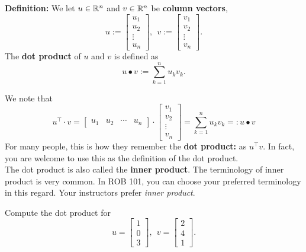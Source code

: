 \begin{tcolorbox}[title=\textbf{\Large Dot Product or Inner Product}]
\textbf{Definition:} We let $u\in \mathbb R^n$ and $v\in \mathbb R^n$ be \textbf{column vectors},
$$u := \begin{bmatrix} u_1 \\ u_2 \\ \vdots \\ u_n\end{bmatrix},~~ v := \begin{bmatrix} v_1 \\ v_2 \\ \vdots \\ v_n\end{bmatrix}.$$
The \textbf{dot product} of $u$ and $v$ is defined as 
$$  u \bullet v := \sum_{k=1}^{n} u_k v_k.$$

We note that
$$u^\top \cdot v =\begin{bmatrix} u_1 & u_2 & \cdots &u_n\end{bmatrix} \cdot \begin{bmatrix} v_1 \\ v_2 \\ \vdots \\ v_n\end{bmatrix} = \sum_{k=1}^{n} u_k v_k =: u \bullet v$$
For many people, this is how they remember the \textbf{dot product:} as $u^\top v$. In fact, you are welcome to use this as the definition of the dot product.\\

The dot product is also called the \textbf{inner product}. The terminology of inner product is very common. In ROB 101, you can choose your preferred terminology in this regard. Your instructors prefer \textit{inner product}. 
%

\end{tcolorbox}

\begin{example}
\label{ex:InnerProduct} Compute the dot product for $$u = \begin{bmatrix} 1 \\ 0 \\ 3\end{bmatrix},~~ v= \begin{bmatrix} 2 \\ 4 \\ 1 \end{bmatrix}.$$
\end{example}


